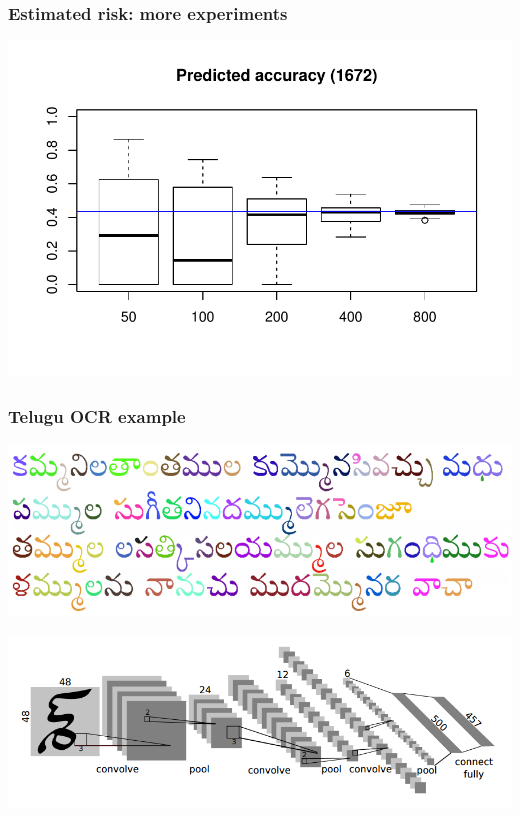 \documentclass{beamer}
\begin{document}
\begin{frame}
\frametitle{Estimated risk: more experiments}
\begin{center}
\includegraphics[scale = 0.6]{../facerec/sub_preds.pdf}
\end{center}
\end{frame}

\begin{frame}
\frametitle{Telugu OCR example}
\begin{center}
\includegraphics[scale = 0.4]{telugu_chars.png}

\includegraphics[scale = 0.3]{telugu_cnn.png}
\end{center}
\end{frame}
\end{document}
